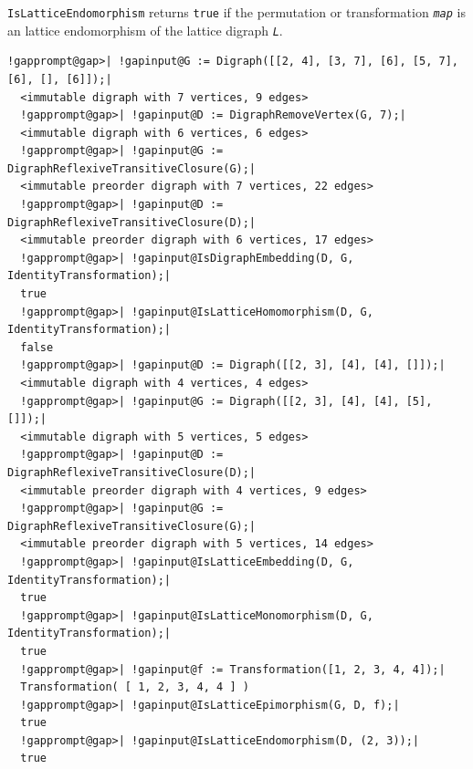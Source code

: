 \documentclass[a4paper,11pt]{report}
\begin{document}
{{{ \texttt{IsLatticeEndomorphism} returns \texttt{true} if the permutation or transformation \mbox{\texttt{\mdseries\slshape map}} is an lattice endomorphism of the lattice digraph \mbox{\texttt{\mdseries\slshape L}}. 
\begin{Verbatim}[commandchars=!@|,fontsize=\small,frame=single,label=Example]
  !gapprompt@gap>| !gapinput@G := Digraph([[2, 4], [3, 7], [6], [5, 7], [6], [], [6]]);|
  <immutable digraph with 7 vertices, 9 edges>
  !gapprompt@gap>| !gapinput@D := DigraphRemoveVertex(G, 7);|
  <immutable digraph with 6 vertices, 6 edges>
  !gapprompt@gap>| !gapinput@G := DigraphReflexiveTransitiveClosure(G);|
  <immutable preorder digraph with 7 vertices, 22 edges>
  !gapprompt@gap>| !gapinput@D := DigraphReflexiveTransitiveClosure(D);|
  <immutable preorder digraph with 6 vertices, 17 edges>
  !gapprompt@gap>| !gapinput@IsDigraphEmbedding(D, G, IdentityTransformation);|
  true
  !gapprompt@gap>| !gapinput@IsLatticeHomomorphism(D, G, IdentityTransformation);|
  false
  !gapprompt@gap>| !gapinput@D := Digraph([[2, 3], [4], [4], []]);|
  <immutable digraph with 4 vertices, 4 edges>
  !gapprompt@gap>| !gapinput@G := Digraph([[2, 3], [4], [4], [5], []]);|
  <immutable digraph with 5 vertices, 5 edges>
  !gapprompt@gap>| !gapinput@D := DigraphReflexiveTransitiveClosure(D);|
  <immutable preorder digraph with 4 vertices, 9 edges>
  !gapprompt@gap>| !gapinput@G := DigraphReflexiveTransitiveClosure(G);|
  <immutable preorder digraph with 5 vertices, 14 edges>
  !gapprompt@gap>| !gapinput@IsLatticeEmbedding(D, G, IdentityTransformation);|
  true
  !gapprompt@gap>| !gapinput@IsLatticeMonomorphism(D, G, IdentityTransformation);|
  true
  !gapprompt@gap>| !gapinput@f := Transformation([1, 2, 3, 4, 4]);|
  Transformation( [ 1, 2, 3, 4, 4 ] )
  !gapprompt@gap>| !gapinput@IsLatticeEpimorphism(G, D, f);|
  true
  !gapprompt@gap>| !gapinput@IsLatticeEndomorphism(D, (2, 3));|
  true
\end{Verbatim}
 }

 }

 }

 
\end{document}
